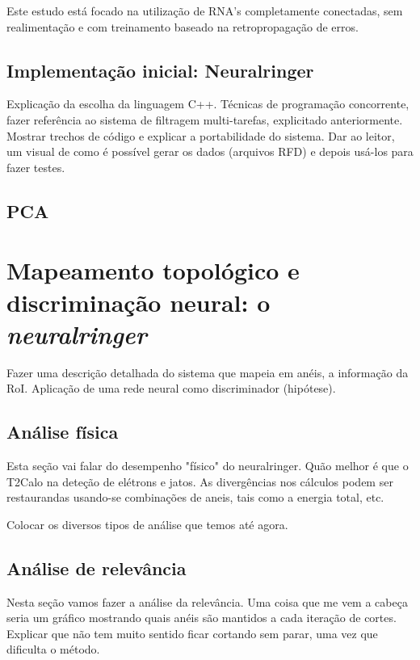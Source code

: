 Este estudo está focado na utilização de RNA's completamente conectadas, sem
realimentação e com treinamento baseado na retropropagação de erros.

\subsection{Implementação inicial: Neuralringer}
\label{sec:framework}

Explicação da escolha da linguagem C++. Técnicas de programação concorrente,
fazer referência ao sistema de filtragem multi-tarefas, explicitado
anteriormente. Mostrar trechos de código e explicar a portabilidade do
sistema. Dar ao leitor, um visual de como é possível gerar os dados (arquivos
RFD) e depois usá-los para fazer testes.

\subsection{PCA}

\section{Mapeamento topológico e discriminação neural: o \emph{neuralringer}}

Fazer uma descrição detalhada do sistema que mapeia em anéis, a informação da
RoI. Aplicação de uma rede neural como discriminador (hipótese).

\subsection{Análise física}

Esta seção vai falar do desempenho "físico" do neuralringer. Quão melhor é que
o T2Calo na deteção de elétrons e jatos. As divergências nos cálculos podem
ser restaurandas usando-se combinações de aneis, tais como a energia total,
etc.

Colocar os diversos tipos de análise que temos até agora.

\subsection{Análise de relevância}

Nesta seção vamos fazer a análise da relevância. Uma coisa que me vem a cabeça
seria um gráfico mostrando quais anéis são mantidos a cada iteração de
cortes. Explicar que não tem muito sentido ficar cortando sem parar, uma vez
que dificulta o método.

